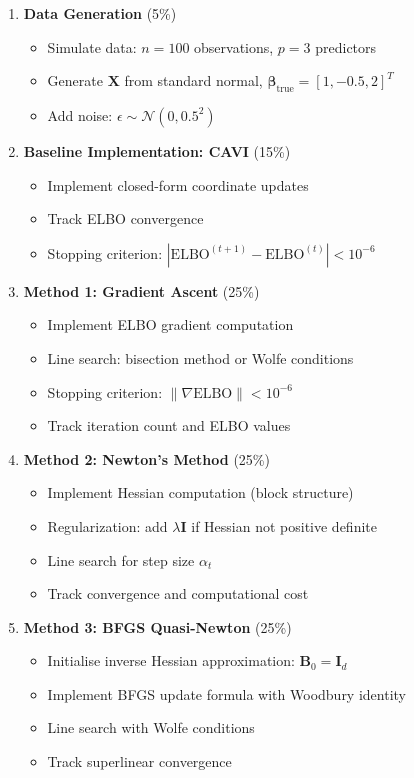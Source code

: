 \documentclass[11pt]{article}
\newcommand{\N}{\mathcal{N}}
\newcommand{\ELBO}{\text{ELBO}}
\begin{document}
\begin{enumerate}[leftmargin=*]
\item \textbf{Data Generation} (5\%)
\begin{itemize}
\item Simulate data: $n = 100$ observations, $p = 3$ predictors
\item Generate $\bm{X}$ from standard normal, $\bm{\beta}_{\text{true}} = [1, -0.5, 2]^T$
\item Add noise: $\epsilon \sim \N(0, 0.5^2)$
\end{itemize}

\item \textbf{Baseline Implementation: CAVI} (15\%)
\begin{itemize}
\item Implement closed-form coordinate updates
\item Track ELBO convergence
\item Stopping criterion: $|\ELBO^{(t+1)} - \ELBO^{(t)}| < 10^{-6}$
\end{itemize}

\item \textbf{Method 1: Gradient Ascent} (25\%)
\begin{itemize}
\item Implement ELBO gradient computation
\item Line search: bisection method or Wolfe conditions
\item Stopping criterion: $\|\nabla \ELBO\| < 10^{-6}$
\item Track iteration count and ELBO values
\end{itemize}

\item \textbf{Method 2: Newton's Method} (25\%)
\begin{itemize}
\item Implement Hessian computation (block structure)
\item Regularization: add $\lambda \bm{I}$ if Hessian not positive definite
\item Line search for step size $\alpha_t$
\item Track convergence and computational cost
\end{itemize}

\item \textbf{Method 3: BFGS Quasi-Newton} (25\%)
\begin{itemize}
\item Initialise inverse Hessian approximation: $\bm{B}_0 = \bm{I}_d$
\item Implement BFGS update formula with Woodbury identity
\item Line search with Wolfe conditions
\item Track superlinear convergence
\end{itemize}


\end{enumerate}
\end{document}

